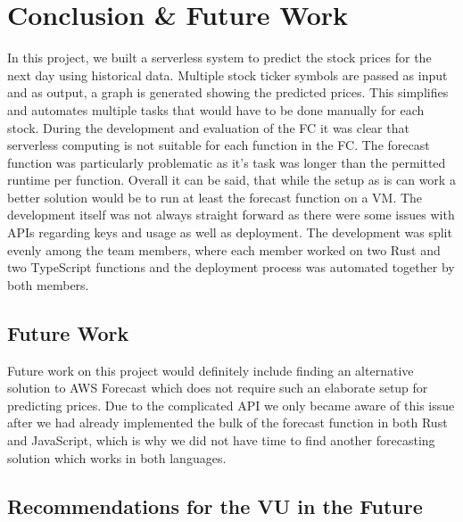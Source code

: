 \chapter{\label{chap:conclusion}Conclusion \& Future Work}

In this project, we built a serverless system to predict the stock prices for
the next day using historical data. Multiple stock ticker symbols are passed as
input and as output, a graph is generated showing the predicted prices. This
simplifies and automates multiple tasks that would have to be done manually for
each stock. During the development and evaluation of the FC it was clear that
serverless computing is not suitable for each function in the FC. The forecast
function was particularly problematic as it's task was longer than the
permitted runtime per function. Overall it can be said, that while the setup as
is can work a better solution would be to run at least the forecast function on
a VM. The development itself was not always straight forward as there were some
issues with APIs regarding keys and usage as well as deployment. The
development was split evenly among the team members, where each member worked
on two Rust and two TypeScript functions and the deployment process was
automated together by both members.




%
%
%
\section{Future Work}

Future work on this project would definitely include finding an alternative
solution to AWS Forecast which does not require such an elaborate setup for
predicting prices.  Due to the complicated API we only became aware of this
issue after we had already implemented the bulk of the forecast function in
both Rust and JavaScript, which is why we did not have time to find another
forecasting solution which works in both languages.



%
%
%
\section{Recommendations for the VU in the Future}

